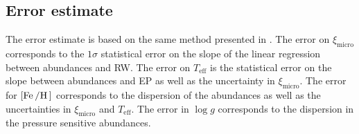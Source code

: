 \subsection{Error estimate}
\label{sec:error_estimate}

The error estimate is based on the same method presented in \citet{Neuforge1997}. The error on
$\xi_\mathrm{micro}$ corresponds to the $1\sigma$ statistical error on the slope of the linear
regression between  abundances and RW. The error on $T_\mathrm{eff}$ is the statistical
error on the slope between  abundances and EP as well as the uncertainty in
$\xi_\mathrm{micro}$. The error for $[\ion{Fe}/\ion{H}]$ corresponds to the dispersion of the
 abundances as well as the uncertainties in $\xi_\mathrm{micro}$ and $T_\mathrm{eff}$.
The error in $\log g$ corresponds to the dispersion in the pressure sensitive 
abundances.

